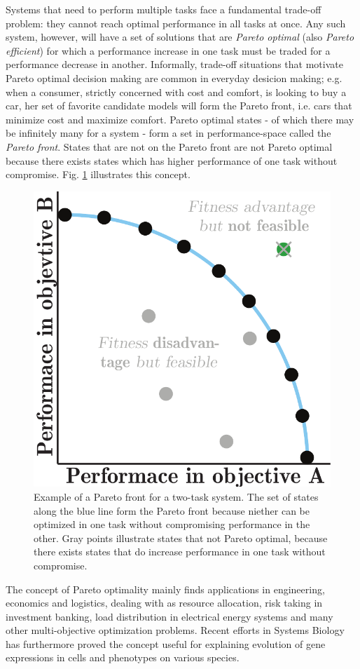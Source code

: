 Systems that need to perform multiple tasks face a fundamental trade-off problem: they cannot reach optimal performance in all tasks at once. Any such system, however, will have a set of solutions that are \textit{Pareto optimal} (also \textit{Pareto efficient}) for which a performance increase in one task must be traded for a performance decrease in another. Informally, trade-off situations that motivate Pareto optimal decision making are common in everyday desicion making; e.g. when a consumer, strictly concerned with cost and comfort, is looking to buy a car, her set of favorite candidate models will form the Pareto front, i.e. cars that minimize cost and maximize comfort. Pareto optimal states - of which there may be infinitely many for a system - form a set in performance-space called the \textit{Pareto front}. States that are not on the Pareto front are not Pareto optimal because there exists states which has higher performance of one task without compromise. Fig. \ref{fig:paretoOptimality} illustrates this concept.

\begin{figure}[h]
\centering
\includegraphics[width=0.5\linewidth]{figures/paretoOptimality.pdf} 
\caption{Example of a Pareto front for a two-task system. The set of states along the blue line form the Pareto front because niether can be optimized in one task without compromising performance in the other. Gray points illustrate states that not Pareto optimal, because there exists states that do increase performance in one task without compromise.}
\label{fig:paretoOptimality}
\end{figure}

The concept of Pareto optimality mainly finds applications in engineering, economics and logistics, dealing with as resource allocation, risk taking in investment banking, load distribution in electrical energy systems and many other multi-objective optimization problems. Recent efforts in Systems Biology has furthermore proved the concept useful for explaining evolution of gene expressions in cells and phenotypes on various species.